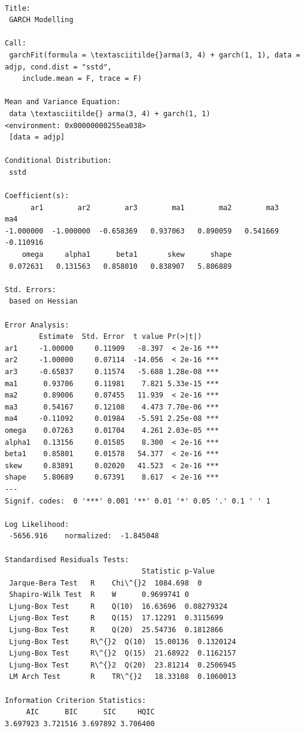 \documentclass[11pt]{article}
\begin{document}
    \begin{Verbatim}[commandchars=\\\{\}]

Title:
 GARCH Modelling

Call:
 garchFit(formula = \textasciitilde{}arma(3, 4) + garch(1, 1), data = adjp, cond.dist = "sstd",
    include.mean = F, trace = F)

Mean and Variance Equation:
 data \textasciitilde{} arma(3, 4) + garch(1, 1)
<environment: 0x00000000255ea038>
 [data = adjp]

Conditional Distribution:
 sstd

Coefficient(s):
      ar1        ar2        ar3        ma1        ma2        ma3        ma4
-1.000000  -1.000000  -0.658369   0.937063   0.890059   0.541669  -0.110916
    omega     alpha1      beta1       skew      shape
 0.072631   0.131563   0.858010   0.838907   5.806889

Std. Errors:
 based on Hessian

Error Analysis:
        Estimate  Std. Error  t value Pr(>|t|)
ar1     -1.00000     0.11909   -8.397  < 2e-16 ***
ar2     -1.00000     0.07114  -14.056  < 2e-16 ***
ar3     -0.65837     0.11574   -5.688 1.28e-08 ***
ma1      0.93706     0.11981    7.821 5.33e-15 ***
ma2      0.89006     0.07455   11.939  < 2e-16 ***
ma3      0.54167     0.12108    4.473 7.70e-06 ***
ma4     -0.11092     0.01984   -5.591 2.25e-08 ***
omega    0.07263     0.01704    4.261 2.03e-05 ***
alpha1   0.13156     0.01585    8.300  < 2e-16 ***
beta1    0.85801     0.01578   54.377  < 2e-16 ***
skew     0.83891     0.02020   41.523  < 2e-16 ***
shape    5.80689     0.67391    8.617  < 2e-16 ***
---
Signif. codes:  0 '***' 0.001 '**' 0.01 '*' 0.05 '.' 0.1 ' ' 1

Log Likelihood:
 -5656.916    normalized:  -1.845048

Standardised Residuals Tests:
                                Statistic p-Value
 Jarque-Bera Test   R    Chi\^{}2  1084.698  0
 Shapiro-Wilk Test  R    W      0.9699741 0
 Ljung-Box Test     R    Q(10)  16.63696  0.08279324
 Ljung-Box Test     R    Q(15)  17.12291  0.3115699
 Ljung-Box Test     R    Q(20)  25.54736  0.1812866
 Ljung-Box Test     R\^{}2  Q(10)  15.00136  0.1320124
 Ljung-Box Test     R\^{}2  Q(15)  21.68922  0.1162157
 Ljung-Box Test     R\^{}2  Q(20)  23.81214  0.2506945
 LM Arch Test       R    TR\^{}2   18.33108  0.1060013

Information Criterion Statistics:
     AIC      BIC      SIC     HQIC
3.697923 3.721516 3.697892 3.706400

    \end{Verbatim}
\end{document}
